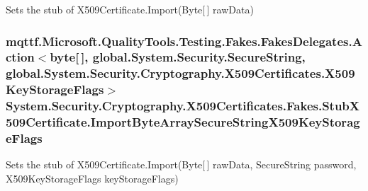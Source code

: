 Sets the stub of X509\-Certificate.\-Import(\-Byte\mbox{[}$\,$\mbox{]} raw\-Data)

\hypertarget{class_system_1_1_security_1_1_cryptography_1_1_x509_certificates_1_1_fakes_1_1_stub_x509_certificate_afb45024c43d95adbb36e3c4d27497cc1}{
\subsubsection[{Import\-Byte\-Array\-Secure\-String\-X509\-Key\-Storage\-Flags}]{\setlength{\rightskip}{0pt plus 5cm}mqttf.\-Microsoft.\-Quality\-Tools.\-Testing.\-Fakes.\-Fakes\-Delegates.\-Action$<$byte\mbox{[}$\,$\mbox{]}, global.\-System.\-Security.\-Secure\-String, global.\-System.\-Security.\-Cryptography.\-X509\-Certificates.\-X509\-Key\-Storage\-Flags$>$ System.\-Security.\-Cryptography.\-X509\-Certificates.\-Fakes.\-Stub\-X509\-Certificate.\-Import\-Byte\-Array\-Secure\-String\-X509\-Key\-Storage\-Flags}}\label{class_system_1_1_security_1_1_cryptography_1_1_x509_certificates_1_1_fakes_1_1_stub_x509_certificate_afb45024c43d95adbb36e3c4d27497cc1}


Sets the stub of X509\-Certificate.\-Import(\-Byte\mbox{[}$\,$\mbox{]} raw\-Data, Secure\-String password, X509\-Key\-Storage\-Flags key\-Storage\-Flags)

